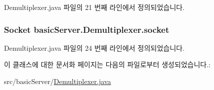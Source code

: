 Demultiplexer.\+java 파일의 21 번째 라인에서 정의되었습니다.

\hypertarget{classbasic_server_1_1_demultiplexer_ae73d9106d863dd9c902a2a941619056b}{
\subsubsection[{socket}]{\setlength{\rightskip}{0pt plus 5cm}Socket basic\+Server.\+Demultiplexer.\+socket\hspace{0.3cm}{\ttfamily [private]}}}\label{classbasic_server_1_1_demultiplexer_ae73d9106d863dd9c902a2a941619056b}


Demultiplexer.\+java 파일의 24 번째 라인에서 정의되었습니다.



이 클래스에 대한 문서화 페이지는 다음의 파일로부터 생성되었습니다.\+:\begin{DoxyCompactItemize}
\item 
src/basic\+Server/\hyperlink{_demultiplexer_8java}{Demultiplexer.\+java}\end{DoxyCompactItemize}
